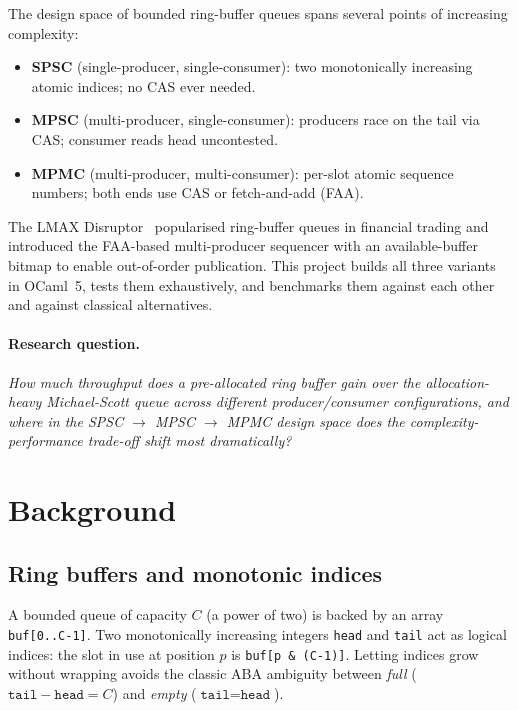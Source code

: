 \documentclass[11pt,a4paper]{article}
\begin{document}
The design space of bounded ring-buffer queues spans several points of increasing complexity:
\begin{itemize}[noitemsep]
  \item \textbf{SPSC} (single-producer, single-consumer): two monotonically increasing atomic indices; no CAS ever needed.
  \item \textbf{MPSC} (multi-producer, single-consumer): producers race on the tail via CAS; consumer reads head uncontested.
  \item \textbf{MPMC} (multi-producer, multi-consumer): per-slot atomic sequence numbers; both ends use CAS or fetch-and-add (FAA).
\end{itemize}
The LMAX Disruptor~\cite{disruptor} popularised ring-buffer queues in financial trading
and introduced the FAA-based multi-producer sequencer with an available-buffer bitmap to
enable out-of-order publication. This project builds all three variants in OCaml~5,
tests them exhaustively, and benchmarks them against each other and against classical alternatives.

\paragraph{Research question.}
\emph{How much throughput does a pre-allocated ring buffer gain over the
allocation-heavy Michael-Scott queue across different producer/consumer configurations,
and where in the SPSC $\to$ MPSC $\to$ MPMC design space does the complexity-performance
trade-off shift most dramatically?}

\section{Background}
\label{sec:background}

\subsection{Ring buffers and monotonic indices}

A bounded queue of capacity $C$ (a power of two) is backed by an array \texttt{buf[0..C-1]}.
Two monotonically increasing integers \texttt{head} and \texttt{tail} act as logical indices:
the slot in use at position $p$ is \texttt{buf[p \& (C-1)]}. Letting indices grow without
wrapping avoids the classic ABA ambiguity between \emph{full} ($\texttt{tail}-\texttt{head}=C$)
and \emph{empty} ($\texttt{tail}=\texttt{head}$).
\end{document}
